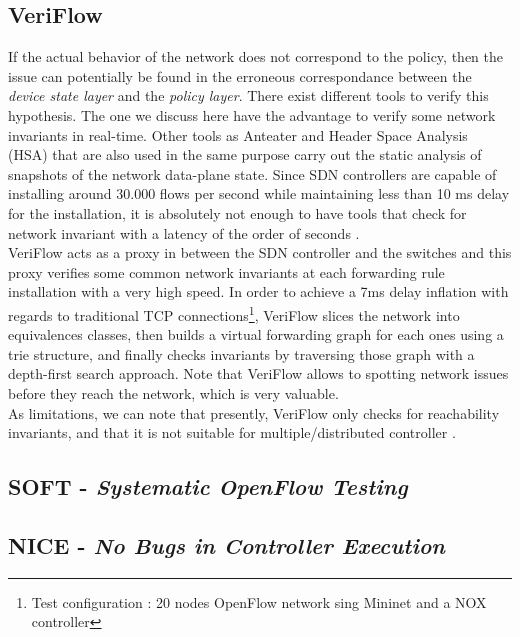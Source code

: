\documentclass[10pt,article]{IEEEtran}
\begin{document}
\subsection{VeriFlow}
If the actual behavior of the network does not correspond to the policy, then the issue can potentially be found in the erroneous correspondance between the \textit{device state layer} and the \textit{policy layer}. There exist different tools to verify this hypothesis. The one we discuss here have the advantage to verify some network invariants in real-time. Other tools as Anteater and Header Space Analysis (HSA) that are also used in the same purpose carry out the static analysis of snapshots of the network data-plane state\cite{Kazemian:2012:HSA:2228298.2228311}\cite{Mai:2011:DDP:2018436.2018470}. Since SDN controllers are capable of installing around 30.000 flows per second while maintaining less than 10 ms delay for the installation, it is absolutely not enough to have tools that check for network invariant with a latency of the order of seconds \cite{Khurshid:2013:VVN:2482626.2482630}.\\
VeriFlow acts as a proxy in between the SDN controller and the switches and this proxy verifies some common network invariants at each forwarding rule installation with a very high speed. In order to achieve a 7ms delay inflation with regards to traditional TCP connections\footnote{Test configuration : 20 nodes OpenFlow network sing Mininet and a NOX controller\cite{Khurshid:2013:VVN:2482626.2482630} }, VeriFlow slices the network into equivalences classes, then builds a virtual forwarding graph for each ones using a trie structure, and finally checks invariants by traversing those graph with a depth-first search approach. Note that VeriFlow allows to spotting network issues before they reach the network, which is very valuable.\\
As limitations, we can note that presently, VeriFlow only checks for reachability invariants, and that it is not suitable for multiple/distributed controller \cite{Khurshid:2013:VVN:2482626.2482630}.

\subsection{SOFT - \textit{Systematic OpenFlow Testing}}

\subsection{NICE - \textit{No Bugs in Controller Execution}}
\end{document}
